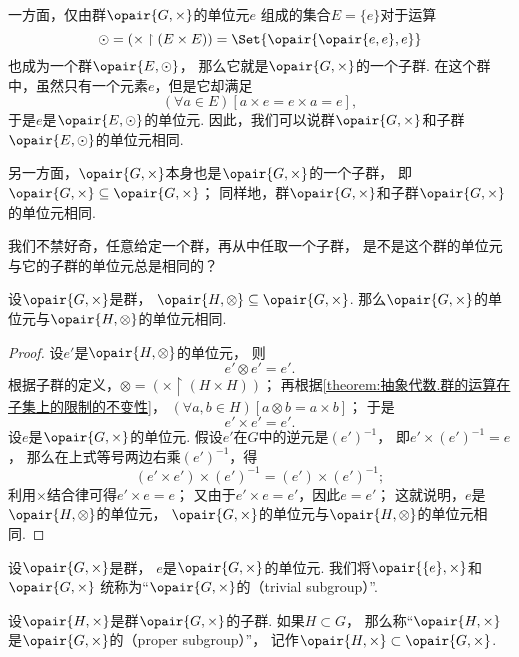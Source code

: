 一方面，仅由群\(\opair{G,\times}\)的单位元\(e\)%
组成的集合\(E=\{e\}\)对于运算\[
	\odot=(\times\upharpoonright(E\times E))
	= \Set{\opair{\opair{e,e},e}}
\]
也成为一个群\(\opair{E,\odot}\)，
那么它就是\(\opair{G,\times}\)的一个子群.
在这个群中，虽然只有一个元素\(e\)，但是它却满足\[
	(\forall a \in E)[a \times e = e \times a = e],
\]
于是\(e\)是\(\opair{E,\odot}\)的单位元.
因此，我们可以说群\(\opair{G,\times}\)和子群\(\opair{E,\odot}\)的单位元相同.

另一方面，\(\opair{G,\times}\)本身也是\(\opair{G,\times}\)的一个子群，
即\(\opair{G,\times}\subseteq\opair{G,\times}\)；
同样地，群\(\opair{G,\times}\)和子群\(\opair{G,\times}\)的单位元相同.

我们不禁好奇，任意给定一个群，再从中任取一个子群，
是不是这个群的单位元与它的子群的单位元总是相同的？

\begin{theorem}\label{theorem:抽象代数.子群.群的单位元与其子群的单位元相同}
设\(\opair{G,\times}\)是群，
\(\opair{H,\otimes}\subseteq\opair{G,\times}\).
那么\(\opair{G,\times}\)的单位元与\(\opair{H,\otimes}\)的单位元相同.
\begin{proof}
设\(e'\)是\(\opair{H,\otimes}\)的单位元，
则\[
	e' \otimes e' = e'.
\]
根据子群的定义，\(\otimes = (\times \upharpoonright(H \times H))\)；
再根据\cref{theorem:抽象代数.群的运算在子集上的限制的不变性}，
\((\forall a,b \in H)[a \otimes b = a \times b]\)；
于是\[
	e' \times e' = e'.
\]
设\(e\)是\(\opair{G,\times}\)的单位元.
假设\(e'\)在\(G\)中的逆元是\((e')^{-1}\)，
即\(e' \times (e')^{-1} = e\)，
那么在上式等号两边右乘\((e')^{-1}\)，得\[
	(e' \times e') \times (e')^{-1} = (e') \times (e')^{-1};
\]
利用\(\times\)结合律可得\(e' \times e = e\)；
又由于\(e' \times e = e'\)，因此\(e = e'\)；
这就说明，\(e\)是\(\opair{H,\otimes}\)的单位元，
\(\opair{G,\times}\)的单位元与\(\opair{H,\otimes}\)的单位元相同.
\end{proof}
\end{theorem}

\begin{definition}
设\(\opair{G,\times}\)是群，
\(e\)是\(\opair{G,\times}\)的单位元.
我们将\(\opair{\{e\},\times}\)和\(\opair{G,\times}\)
统称为“\(\opair{G,\times}\)的（trivial subgroup）”.
\end{definition}

\begin{definition}
设\(\opair{H,\times}\)是群\(\opair{G,\times}\)的子群.
如果\(H \subset G\)，
那么称“\(\opair{H,\times}\)是\(\opair{G,\times}\)的（proper subgroup）”，
记作\(\opair{H,\times}\subset\opair{G,\times}\).
\end{definition}

